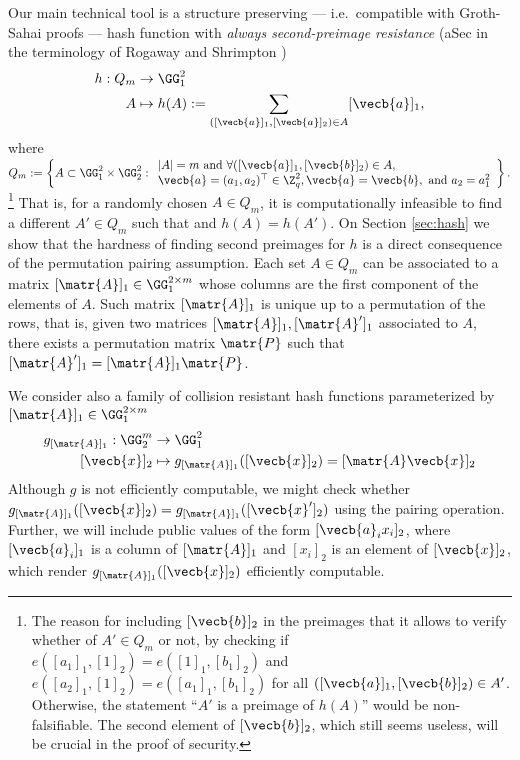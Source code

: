 Our main technical tool is a structure preserving --- i.e.~compatible with Groth-Sahai proofs --- hash function with \emph{always second-preimage resistance} (aSec in the terminology of Rogaway and Shrimpton \cite{FSE:RogShr04})
\begin{align*}
h : Q_m &\to \GG^2_1\\
      A &\mapsto h(A) := \sum_{([\vecb{a}]_1,[\vecb{a}]_2)\in A} [\vecb{a}]_1,
\end{align*}
 where
$
Q_m:= \left\{A\subset\GG^2_1\times\GG_2^2:
\begin{array}{l}
 |A|=m \text{ and }\forall ([\vecb{a}]_1,[\vecb{b}]_2)\in A,\\
\vecb{a}=(a_1,a_2)^\top\in\Z_q^2, \vecb{a}=\vecb{b}, \text{ and } a_2=a_1^2
\end{array}\right\}.
$
\footnote{The reason for including $[\vecb{b}]_2$ in the preimages that it allows to verify whether of $A'\in Q_m$ or not, by checking if $e([a_1]_1,[1]_2)=e([1]_1,[{b}_1]_2)$ and $e([a_2]_1,[1]_2)=e([a_1]_1,[b_1]_2)$ for all $([\vecb{a}]_1,[\vecb{b}]_2)\in A'$. Otherwise, the statement ``$A'$ is a preimage of $h(A)$'' would be non-falsifiable. The second element of $[\vecb{b}]_2$, which still seems useless, will be crucial in the proof of security.} 
That is, for a randomly chosen $A\in Q_m$, it is computationally infeasible to find a different $A'\in Q_m$ such that and $h(A)=h(A')$. On Section \ref{sec:hash} we show that the hardness of finding second preimages for $h$ is a direct consequence of the permutation pairing assumption.
Each set $A\in Q_m$  can be associated to a matrix $[\matr{A}]_1\in \GG^{2\times m}_1$ whose columns are the first component of the elements of $A$. Such matrix $[\matr{A}]_1$ is unique up to a permutation of the rows, that is, given two matrices $[\matr{A}]_1,[\matr{A}']_1$ associated to $A$, there exists a permutation matrix $\matr{P}$ such that $[\matr{A}']_1 = [\matr{A}]_1\matr{P}$.

We consider also a family of collision resistant hash functions parameterized by $[\matr{A}]_1\in\GG^{2\times m}_1$
\begin{align*}
g_{[\matr{A}]_1} : \GG^m_2 &\to \GG^2_1\\
           [\vecb{x}]_2 &\mapsto g_{[\matr{A}]_1}([\vecb{x}]_2) = [\matr{A}\vecb{x}]_2
\end{align*}
Although $g$ is not efficiently computable, we might check whether $g_{[\matr{A}]_1}([\vecb{x}]_2)=g_{[\matr{A}]_1}([\vecb{x}']_2)$ using the pairing operation. Further, we will include public values of the form $[\vecb{a}_ix_i]_2$, where $[\vecb{a}_i]_1$ is a column of $[\matr{A}]_1$ and $[x_i]_2$ is an element of $[\vecb{x}]_2$, which render  $g_{[\matr{A}]_1}([\vecb{x}]_2)$ efficiently computable.

